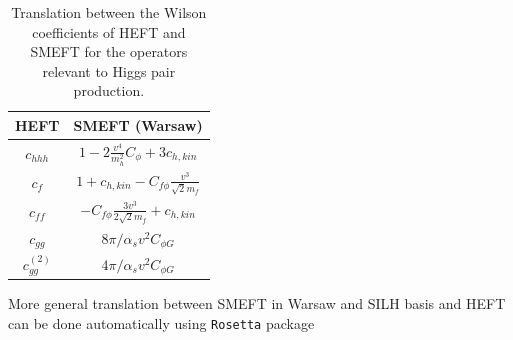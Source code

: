 \begin{table}[htb]
	\begin{center}
		\begin{tabular}{ c c }
			\toplinetwo
			HEFT& SMEFT (Warsaw)\\
			\midrule
			$c_{hhh}$&$1-2\frac{v^4}{m_h^2}C_\phi+3c_{h,kin}$ \\
			$c_f$ & $1+c_{h,kin} -C_{f\phi} \frac{v^3}{\sqrt{2} m_f}$\\
			$ c_{ff} $ &$-C_{f\phi} \frac{3 v^3}{2\sqrt{2} m_f} + c_{h,kin}$\\
			$c_{gg}$  & $8\pi/\alpha_s v^2 C_{\phi G}$ \\
			$c_{gg}^{(2)}$  & $4\pi/\alpha_s v^2 C_{\phi G}$ \\
			\bottomrule
		\end{tabular}
	\end{center}
	\caption{Translation between the Wilson coefficients of HEFT and SMEFT for the operators relevant to Higgs pair production. \label{tab:translation}}
\end{table}
More general translation between SMEFT in Warsaw and SILH basis and HEFT can be done automatically using \texttt{Rosetta} package~\cite{Falkowski:2015wza}
